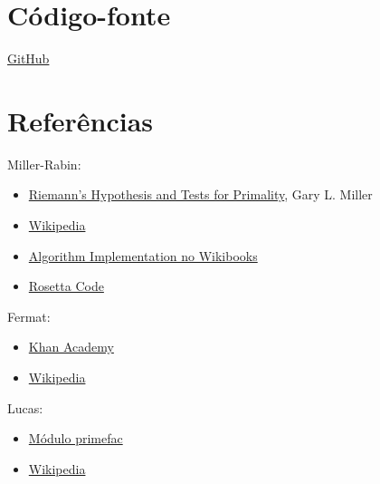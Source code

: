 \documentclass[12pt]{article}
\begin{document}
\section{Código-fonte}
\href{https://github.com/lucasjoao/computer_security/tree/master/t04_prime}
{GitHub}

\section{Referências}
Miller-Rabin:
\begin{itemize}
  \item \href{https://www.cs.cmu.edu/~glmiller/Publications/Papers/Mi76.pdf}
  {Riemann's Hypothesis and Tests for Primality}, Gary L. Miller
  \item \href{https://en.wikipedia.org/wiki/Miller%E2%80%93Rabin_primality_test}
  {Wikipedia}
  \item \href{https://goo.gl/prTCSK}{Algorithm Implementation no Wikibooks}
  \item \href{https://rosettacode.org/wiki/Miller%E2%80%93Rabin_primality_test}
  {Rosetta Code}
\end{itemize}

Fermat:
\begin{itemize}
  \item \href{https://goo.gl/fwCCM3}{Khan Academy}
  \item \href{https://en.wikipedia.org/wiki/Fermat_primality_test}
  {Wikipedia}
\end{itemize}

Lucas:
\begin{itemize}
  \item \href{https://github.com/elliptic-shiho/primefac-fork}
  {Módulo primefac}
  \item \href{https://en.wikipedia.org/wiki/Lucas_primality_test}
  {Wikipedia}
\end{itemize}
\end{document}
